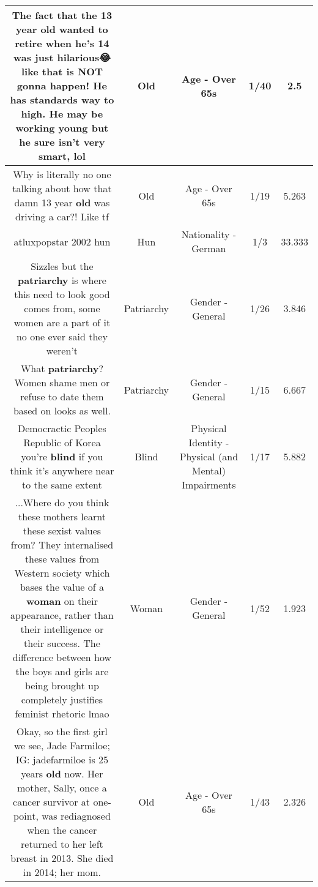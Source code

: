 \documentclass[11pt]{article}
\newlength\mylength
\begin{document}
\begin{center}
\begin{longtable}{|C{.65\mylength}|C{.30\mylength}|C{.12\mylength}|C{.12\mylength}|C{.12\mylength}|}
  \small The fact that the 13 year \textbf{old} wanted to retire when he's 14 was just hilarious😂 like that is NOT gonna happen! He has standards way to high. He may be working young but he sure isn't very smart, lol\normalsize   & Old & Age - Over 65s & 1/40 & 2.5 \\  \hline
  \small Why is literally no one talking about how that damn 13 year \textbf{old} was driving a car?! Like tf\normalsize   & Old & Age - Over 65s & 1/19 & 5.263 \\  \hline
  \small atluxpopstar 2002 hun\normalsize   & Hun & Nationality - German & 1/3 & 33.333 \\  \hline
  \small Sizzles but the \textbf{patriarchy} is where this need to look good comes from, some women are a part of it no one ever said they weren't\normalsize   & Patriarchy & Gender - General & 1/26 & 3.846 \\  \hline
  \small What \textbf{patriarchy}? Women shame men or refuse to date them based on looks as well.\normalsize   & Patriarchy & Gender - General & 1/15 & 6.667 \\  \hline
  \small Democractic Peoples Republic of Korea you're \textbf{blind} if you think it's anywhere near to the same extent\normalsize   & Blind & Physical Identity - Physical (and Mental) Impairments & 1/17 & 5.882 \\  \hline
  \small ...Where do you think these mothers learnt these sexist values from? They internalised these values from Western society which bases the value of a \textbf{woman} on their appearance, rather than their intelligence or their success. The difference between how the boys and girls are being brought up completely justifies feminist rhetoric lmao\normalsize   & Woman & Gender - General & 1/52 & 1.923 \\  \hline
  \small Okay, so the first girl we see, Jade Farmiloe; IG: jadefarmiloe is 25 years \textbf{old} now. Her mother, Sally, once a cancer survivor at one-point, was rediagnosed when the cancer returned to her left breast in 2013. She died in 2014; her mom.\normalsize   & Old & Age - Over 65s & 1/43 & 2.326 \\  \hline

\end{longtable}
\end{center}
\end{document}
